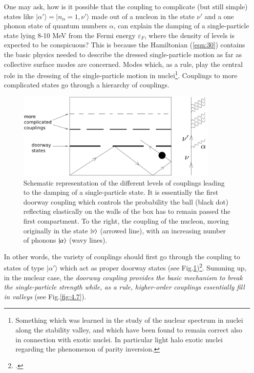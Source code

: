 One may ask, how  is it possible that the coupling to complicate (but still simple) states like $|\alpha'\rangle = |n_\alpha = 1,\nu'\rangle$ made out of a nucleon in the state $\nu'$ and a one phonon state of quantum numbers $\alpha$, can explain the  damping of a single-particle state lying 8-10 MeV from the Fermi energy $\varepsilon_F$, where the density of levels  is expected to be conspicuous? This is because the Hamiltonian  (\ref{eqn:30}) contains  the basic physics needed to describe the dressed single-particle motion as far as collective surface modes are concerned. Modes which, as a rule, play the central role in the dressing of the single-particle motion in nuclei\footnote{Something which was learned in the study of the nuclear spectrum in nuclei along the stability valley, and which have been found to remain correct also in connection with exotic nuclei. In particular light halo exotic nuclei regarding the phenomenon of parity inversion.}. Couplings to more complicated states  go through a hierarchy of couplings.
\begin{figure}[h!]
\centerline {
\includegraphics*[width=10cm]{introduccion/figs/figintroD6}
}
\caption{Schematic representation of the different levels of couplings leading to the damping of a single-particle state. It is essentially the first doorway coupling which controls the probability the ball (black dot) reflecting elastically on the walls of the box has to remain passed the first compartment. To the right, the coupling of the nucleon, moving originally in the state $|{\nu} \rangle$ (arrowed line), with an increasing number of phonons $|{\alpha} \rangle$ (wavy lines).}
\label{fig:4.6}
\end{figure}
In other words, the variety of couplings  should first go  through the coupling to states of type $|\alpha'\rangle$ which act as proper doorway states (see Fig.\ref{fig:4.6})\footnote{\cite{Feshbach:58}.}. Summing up, in  the nuclear case, the {\it doorway coupling provides the basic mechanism to break  the single-particle strength while, as a rule, higher-order couplings essentially   fill in valleys} (see Fig.\ref{fig:4.7}).

